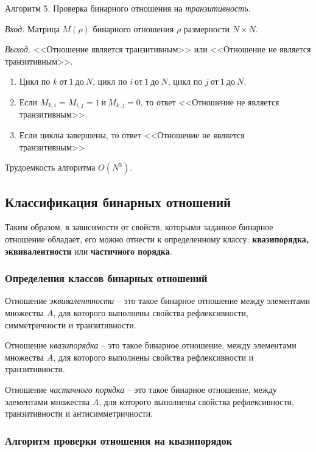 \documentclass[bachelor, och, labwork]{shiza}
\begin{document}
Алгоритм 5. Проверка бинарного отношения на \textit{транзитивность}.

\textit{Вход.} Матрица $M(\rho)$ бинарного отношения $\rho$ размерности
$N \times N$.

\textit{Выход.} <<Отношение является транзитивным>> или <<Отношение не является
транзитивным>>.

\begin{enumerate}
    
    \item Цикл по $k ~\text{от}~ 1 ~\text{до}~ N$, 
    цикл по $i ~\text{от}~ 1 ~\text{до}~ N$, цикл по $j ~\text{от}~ 1 ~\text{до}~ N$.
    
    \item Если $M_{k,i}=M_{i,j}=1 ~\text{и}~ M_{k,j}=0$, то ответ <<Отношение не является
    транзитивным>>.
   
    \item Если циклы завершены, то ответ <<Отношение не является транзитивным>>

\end{enumerate}
Трудоемкость алгоритма $O(N^3)$.

\subsection{Классификация бинарных отношений}

Таким образом, в зависимости от свойств, которыми заданное бинарное отношение
обладает, его можно отнести к определенному классу: \textbf{квазипорядка,
эквивалентности} или \textbf{частичного порядка}. 

\subsubsection{Определения классов бинарных отношений}

Отношение \textit{эквивалентности} -- это такое бинарное отношение между элементами
множества $A$, для которого выполнены свойства рефлексивности, симметричности 
и транзитивности.

Отношение \textit{квазипорядка} -- это такое бинарное отношение, между элементами
множества $A$, для которого выполнены свойства рефлексивности и транзитивности.

Отношение \textit{частичного порядка} -- это такое бинарное отношение, между
элементами множества $A$, для которого выполнены свойства рефлексивности, 
транзитивности и антисимметричности.

\subsubsection{Алгоритм проверки отношения на квазипорядок}
\end{document}
